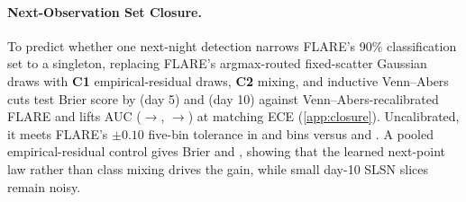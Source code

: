 \paragraph{Next-Observation Set Closure.}
To predict whether one next-night detection narrows FLARE's 90\% classification set to a singleton, replacing FLARE's argmax-routed fixed-scatter Gaussian draws with \textbf{C1} empirical-residual draws, \textbf{C2} mixing, and inductive Venn--Abers \citep{vovk2014venn} cuts test Brier score by \CloFiveBrierGainVA{} (day 5) and \CloTenBrierGainVA{} (day 10) against Venn--Abers-recalibrated FLARE and lifts AUC (\CloFiveAUCDep{}$\to$\CloFiveAUCOurs{}, \CloTenAUCDep{}$\to$\CloTenAUCOurs{}) at matching ECE (\cref{app:closure}).
Uncalibrated, it meets FLARE's $\pm0.10$ five-bin tolerance in \CloFiveProfOursRaw{} and \CloTenProfOursRaw{} bins versus \CloFiveProfDep{} and \CloTenProfDep{}.
A pooled empirical-residual control gives Brier \CloFiveBrierPooled{} and \CloTenBrierPooled{}, showing that the learned next-point law rather than class mixing drives the gain, while small day-10 SLSN slices remain noisy.
